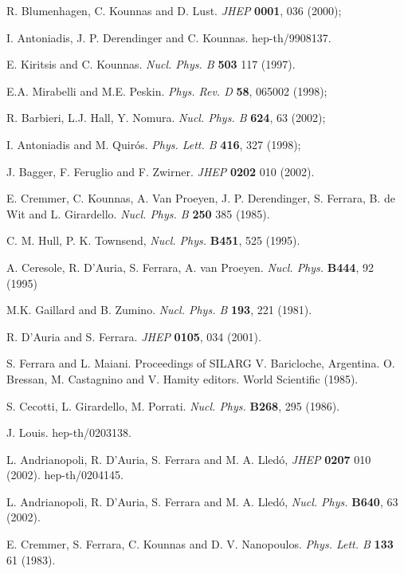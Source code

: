 \documentclass[a4paper,12pt]{article}
\begin{document}
\begin{thebibliography}{99}
R. Blumenhagen, C. Kounnas and D. Lust. {\it JHEP}
{\bf 0001}, 036 (2000);

I. Antoniadis, J. P. Derendinger and C. Kounnas. hep-th/9908137.


 E. Kiritsis and C. Kounnas.
{\it Nucl. Phys. B }{\bf 503} 117 (1997).





E.A. Mirabelli and M.E. Peskin. {\it Phys. Rev. D} {\bf
58},  065002 (1998);

R. Barbieri, L.J. Hall, Y. Nomura.  {\it
Nucl. Phys. B} {\bf 624}, 63  (2002);



 I. Antoniadis and M. Quir\'os. {\it Phys. Lett. B} {\bf 416}, 327 (1998);


J. Bagger, F. Feruglio and F. Zwirner. {\it JHEP} {\bf 0202} 010 (2002).



E. Cremmer, C. Kounnas, A. Van Proeyen, J. P. Derendinger, S.
Ferrara, B. de Wit and L. Girardello. {\it  Nucl. Phys. B} {\bf 250} 385 (1985).
 
 
  C. M. Hull, P. K. Townsend, {\it  Nucl. Phys. } {\bf B451}, 525 (1995).
 
  A. Ceresole, R. D'Auria, S. Ferrara, A. van Proeyen. {\it  Nucl. Phys. } {\bf B444}, 92 (1995)
 
M.K. Gaillard and B. Zumino. {\it Nucl. Phys. B} {\bf 193}, 221 (1981).

  R. D'Auria and S. Ferrara. {\it JHEP} {\bf 0105}, 034 (2001).


S. Ferrara and L. Maiani. Proceedings of SILARG V. Baricloche, Argentina. O. Bressan, M. Castagnino and V. 
Hamity editors. World Scientific (1985).

 S. Cecotti, L. Girardello, M. Porrati. {\it  Nucl. Phys. } {\bf B268}, 295 (1986).

 J. Louis. hep-th/0203138.
 
 

 L. Andrianopoli, R. D'Auria, S. Ferrara and M. A. Lled\'o, {\it JHEP} {\bf 0207} 010 (2002).
hep-th/0204145.

 L. Andrianopoli, R. D'Auria, S. Ferrara and M. A. Lled\'o,
{\it  Nucl. Phys. } {\bf B640}, 63 (2002).



E. Cremmer, S. Ferrara, C. Kounnas and D. V. Nanopoulos.
{\it Phys. Lett. B} {\bf 133} 61 (1983).


\end{thebibliography}
\end{document}
